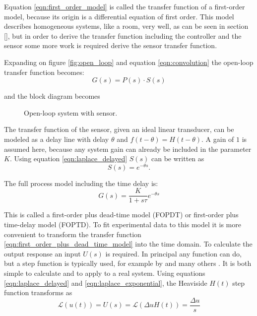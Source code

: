 Equation \ref{eqn:first_order_model} is called the transfer function of a first-order model, because its origin is a differential equation of first order. This model describes homogeneous systems, like a room, very well, as can be seen in section \ref{}, but in order to derive the transfer function including the controller and the sensor some more work is required derive the sensor transfer function.

Expanding on figure \ref{fig:open_loop} and equation \ref{eqn:convolution} the open-loop transfer function becomes:
\begin{equation}
    G(s) = P(s) \cdot S(s)
\end{equation}

and the block diagram becomes
\begin{figure}[ht]
    \centering
    \caption{Open-loop system with sensor.}
\end{figure}

The transfer function of the sensor, given an ideal linear transducer, can be modeled as a delay line with delay $\theta$ and $f(t-\theta) = H(t-\theta)$. A gain of $1$ is assumed here, because any system gain can already be included in the parameter $K$. Using equation \ref{eqn:laplace_delayed} $S(s)$ can be written as
\begin{equation}
    S(s) = e^{-\theta s} .
\end{equation}

The full process model including the time delay is:
\begin{equation}
    G(s) = \frac{K}{1 + s\tau} e^{-\theta s} \label{eqn:first_order_plus_dead_time_model}
\end{equation}

This is called a first-order plus dead-time model (FOPDT) or first-order plus time-delay model (FOPTD). To fit experimental data to this model it is more convenient to transform the transfer function \ref{eqn:first_order_plus_dead_time_model} into the time domain. To calculate the output response an input $U(s)$ is required. In principal any function can do, but a step function is typically used, for example by \citeauthor{ziegler_nichols} \cite{ziegler_nichols} and many others \cite{tuning_rules,pessen_integral,simc,simc_paper,pid_controllers_for_time_delay_systems,pi_stabilization_of_fopdt_systems, pid_basics}. It is both simple to calculate and to apply to a real system. Using equations \ref{eqn:laplace_delayed} and \ref{eqn:laplace_exponential}, the Heaviside $H(t)$ step function transforms as
\begin{equation}
    \mathscr{L} \left(u(t) \right) = U(s) = \mathscr{L} \left( \Delta u H(t) \right) = \frac{\Delta u}{s}
\end{equation}

